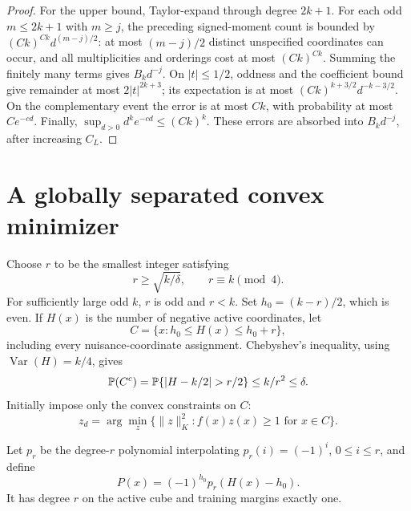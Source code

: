 \documentclass[11pt,a4paper]{article}
\theoremstyle{remark}\newtheorem{remark}[theorem]{Remark}
\newcommand{\normK}[1]{\lVert #1\rVert_K}
\begin{document}
\begin{proof}
For the upper bound, Taylor-expand through degree $2k+1$. For each odd
$m\le2k+1$ with $m\ge j$, the preceding signed-moment count is bounded
by $(Ck)^{Ck}d^{(m-j)/2}$: at most $(m-j)/2$ distinct unspecified
coordinates can occur, and all multiplicities and orderings cost at most
$(Ck)^{Ck}$. Summing the finitely many terms gives $B_kd^{-j}$. On
$|t|\le1/2$, oddness and the coefficient bound give remainder at most
$2|t|^{2k+3}$; its expectation is at most
$(Ck)^{k+3/2}d^{-k-3/2}$. On the complementary event the error is at
most $Ck$, with probability at most $Ce^{-cd}$. Finally,
$\sup_{d>0}d^ke^{-cd}\le(Ck)^k$. These errors are absorbed into
$B_kd^{-j}$, after increasing $C_L$.
\end{proof}

\section{A globally separated convex minimizer}
Choose $r$ to be the smallest integer satisfying
\begin{equation}\label{eq:rchoice}
 r\ge\sqrt{k/\delta},\qquad r\equiv k\pmod4.
\end{equation}
For sufficiently large odd $k$, $r$ is odd and $r<k$. Set
$h_0=(k-r)/2$, which is even. If $H(x)$ is the number of negative active
coordinates, let
\[
 C=\{x:h_0\le H(x)\le h_0+r\},
\]
including every nuisance-coordinate assignment. Chebyshev's inequality,
using $\operatorname{Var}(H)=k/4$, gives
\begin{equation}\label{eq:mass}
 \Pp(C^c)=\Pp\{|H-k/2|>r/2\}\le k/r^2\le\delta.
\end{equation}
Initially impose only the convex constraints on $C$:
\begin{equation}\label{eq:convex}
 z_d=\arg\min_z\{\normK z^2:f(x)z(x)\ge1\text{ for }x\in C\}.
\end{equation}

Let $p_r$ be the degree-$r$ polynomial interpolating
$p_r(i)=(-1)^i$, $0\le i\le r$, and define
\begin{equation}\label{eq:interpolant}
 P(x)=(-1)^{h_0}p_r(H(x)-h_0).
\end{equation}
It has degree $r$ on the active cube and training margins exactly one.
\end{document}
